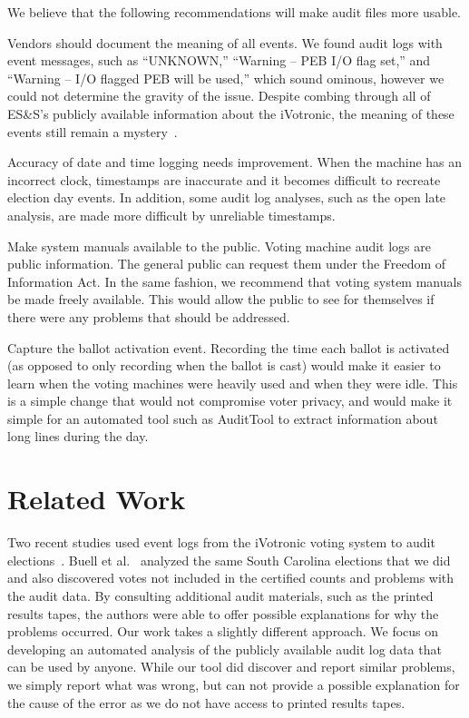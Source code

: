 \documentclass[letterpaper,twocolumn,10pt]{article}
\begin{document}
We believe that the following recommendations will make audit files more usable. 
 
Vendors should document the meaning of all events. We found audit logs with
event messages, such as ``UNKNOWN,'' ``Warning – PEB I/O flag set,'' and
``Warning – I/O flagged PEB will be used,'' which sound ominous, however we
could not determine the gravity of the issue. Despite combing through all of
ES\&S’s publicly available information about the iVotronic, the meaning of these
events still remain a mystery~\cite{VerVot2011, ESS2011a, ESS2011b}. 
 
Accuracy of date and time logging needs improvement. When the machine has an
incorrect clock, timestamps are inaccurate and it becomes difficult to recreate
election day events. In addition, some audit log analyses, such as the open late
analysis, are made more difficult by unreliable timestamps. 
 
Make system manuals available to the public. Voting machine audit logs are
public information. The general public can request them under the Freedom of
Information Act. In the same fashion, we recommend that voting system manuals be
made freely available. This would allow the public to see for themselves if
there were any problems that should be addressed.  
 
Capture the ballot activation event. Recording the time each ballot is activated
(as opposed to only recording when the ballot is cast) would make it easier to
learn when the voting machines were heavily used and when they were idle. This
is a simple change that would not compromise voter privacy, and would make it
simple for an automated tool such as AuditTool to extract information
about long lines during the day.
 
 \section{Related Work}
Two recent studies used event logs from the iVotronic voting system to audit
elections~\cite{Buell2011, Sandler2007}. Buell et al.~\cite{Buell2011} analyzed
the same South Carolina elections that we did and also discovered votes not
included in the certified counts and problems with the audit data. By consulting
additional audit materials, such as the printed results tapes, the authors were
able to offer possible explanations for why the problems occurred. Our work
takes a slightly different approach. We focus on developing an automated
analysis of the publicly available audit log data that can be used by
anyone. While our tool did discover and report similar problems, we simply
report what was wrong, but can not provide a possible explanation for the cause
of the error as we do not have access to printed results tapes.  
\end{document}
